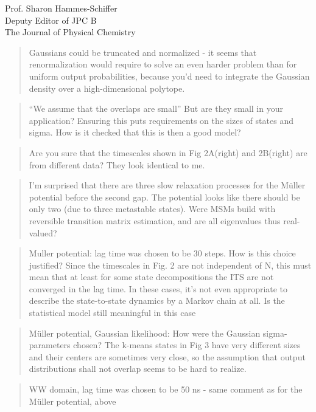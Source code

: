 \documentclass{letter}
\begin{document}
\begin{letter}{Prof. Sharon Hammes-Schiffer \\ Deputy Editor of JPC B \\ The Journal of Physical Chemistry}
\begin{quote}
Gaussians could be truncated and normalized - it seems that renormalization would require to solve an even harder problem than for uniform output probabilities, because you’d need to integrate the Gaussian density over a high-dimensional polytope.
\end{quote}

\begin{quote}
``We assume that the overlaps are small'' But are they small in your application? Ensuring this puts requirements on the sizes of states and sigma. How is it checked that this is then a good model?
\end{quote}

\begin{quote}
Are you sure that the timescales shown in Fig 2A(right) and 2B(right) are from different data? They look identical to me.
\end{quote}

\begin{quote}
I’m surprised that there are three slow relaxation processes for the Müller potential before the second gap. The potential looks like there should be only two (due to three metastable states). Were MSMs build with reversible transition matrix estimation, and are all eigenvalues thus real-valued?
\end{quote}

\begin{quote}
Muller potential: lag time was chosen to be 30 steps. How is this choice justified? Since the timescales in Fig. 2 are not independent of N, this must mean that at least for some state decompositions the ITS are not converged in the lag time. In these cases, it’s not even appropriate to describe the state-to-state dynamics by a Markov chain at all. Is the statistical model still meaningful in this case
\end{quote}

\begin{quote}
Müller potential, Gaussian likelihood: How were the Gaussian sigma-parameters chosen? The k-means states in Fig 3 have very different sizes and their centers are sometimes very close, so the assumption that output distributions shall not overlap seems to be hard to realize.
\end{quote}

\begin{quote}
WW domain, lag time was chosen to be 50 ns - same comment as for the Müller potential, above
\end{quote}


\end{letter}
\end{document}
